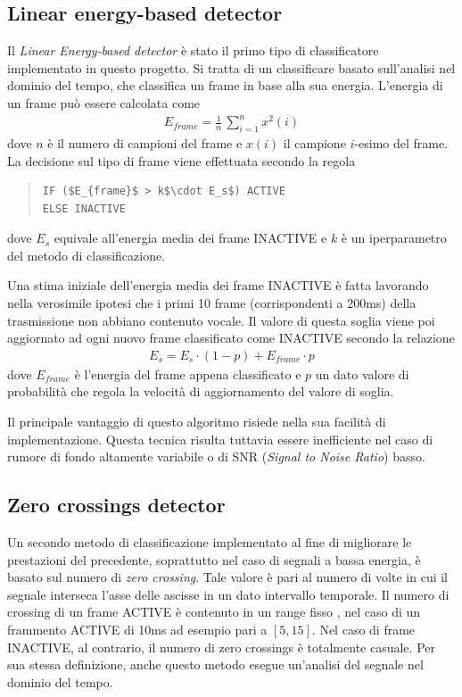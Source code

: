 \documentclass[10pt,twocolumn]{article}
\begin{document}
{\subsection{Linear energy-based detector}
\label{sect:led}
{Il \textit{Linear Energy-based detector} è stato il primo tipo di classificatore implementato in questo progetto. Si tratta di un classificare basato sull'analisi nel dominio del tempo, che classifica un frame in base alla sua energia. L'energia di un frame può essere calcolata come}
\begin{align*}
E_{frame} = \frac{1}{n} \, \sum_{i=1}^{n} x^2(i)
\end{align*}
dove $n$ è il numero di campioni del frame e $x(i)$ il campione $i$-esimo del frame. La decisione sul tipo di frame viene effettuata secondo la regola
\begin{quote}
\begin{lstlisting}
IF ($E_{frame}$ > k$\cdot E_s$) ACTIVE
ELSE INACTIVE
\end{lstlisting}
\end{quote}
\vspace{-0.2cm}
dove $E_s$ equivale all'energia media dei frame INACTIVE e $k$ è un iperparametro del metodo di classificazione.

\vspace{0.1cm}
Una stima iniziale dell'energia media dei frame INACTIVE è fatta lavorando nella verosimile ipotesi che i primi
10 frame (corrispondenti a 200ms) della trasmissione non abbiano contenuto vocale. Il valore di questa soglia
viene poi aggiornato ad ogni nuovo frame classificato come INACTIVE secondo la relazione
\begin{align}
E_s = E_s \cdot (1-p) + E_{frame} \cdot p
\label{eq:upd}
\end{align}
dove $E_{frame}$ è l'energia del frame appena classificato e $p$ un dato valore di probabilità che regola la
velocità di aggiornamento del valore di soglia.

Il principale vantaggio di questo algoritmo risiede nella sua facilità di implementazione. Questa tecnica
risulta tuttavia essere inefficiente nel caso di rumore di fondo altamente variabile o di SNR 
(\textit{Signal to Noise Ratio}) basso. 
\pagebreak

\subsection{Zero crossings detector}
Un secondo metodo di classificazione implementato al fine di migliorare le prestazioni del
precedente, soprattutto nel caso di segnali a bassa energia, è basato sul numero di 
\textit{zero crossing}. Tale valore è pari al numero di volte in cui il segnale interseca
l'asse delle ascisse in un dato intervallo temporale. Il numero di crossing di un frame ACTIVE è contenuto
in un range fisso \cite{Rabiner1975AnAF}, nel caso di un frammento ACTIVE di 10ms ad esempio pari a $[5,15]$. 
Nel caso di frame INACTIVE, al contrario, il numero di zero crossings è totalmente casuale. 
Per sua stessa definizione, anche questo metodo esegue un'analisi del segnale nel dominio del tempo.

}
\end{document}
